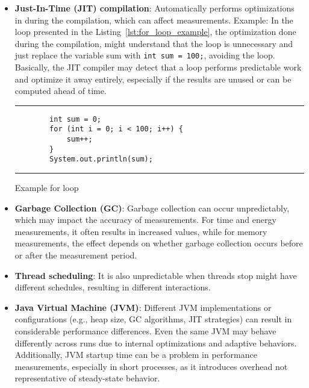 \begin{itemize}
    \item \textbf{Just-In-Time (JIT) compilation}: Automatically performs optimizations in during the compilation, which can affect measurements. Example: In the loop presented in the Listing~\ref{lst:for_loop_example}, the optimization done during the compilation, might understand that the loop is unnecessary and just replace the variable sum with \texttt{int sum = 100;}, avoiding the loop. Basically, the JIT compiler may detect that a loop performs predictable work and optimize it away entirely, especially if the results are unused or can be computed ahead of time.
    
    \begin{listing}[H]
    \noindent\rule{\linewidth}{0.4pt}
    \begin{verbatim}
        int sum = 0;
        for (int i = 0; i < 100; i++) {
            sum++;
        }
        System.out.println(sum);
    \end{verbatim}
    \noindent\rule{\linewidth}{0.4pt}
    \caption{Example for loop}            
    \label{lst:for_loop_example}
    \end{listing}

    
    \item \textbf{Garbage Collection (GC)}: Garbage collection can occur unpredictably, which may impact the accuracy of measurements. For time and energy measurements, it often results in increased values, while for memory measurements, the effect depends on whether garbage collection occurs before or after the measurement period.
    
    \item \textbf{Thread scheduling}: It is also unpredictable when threads stop might have different schedules, resulting in different interactions.
    
    \item \textbf{Java Virtual Machine (JVM)}: Different JVM implementations or configurations (e.g., heap size, GC algorithms, JIT strategies) can result in considerable performance differences. Even the same JVM may behave differently across runs due to internal optimizations and adaptive behaviors. Additionally, JVM startup time can be a problem in performance measurements, especially in short processes, as it introduces overhead not representative of steady-state behavior.

\end{itemize}

